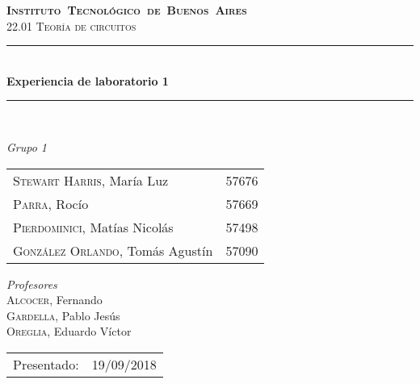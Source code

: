 \begin{titlepage}
\newcommand{\HRule}{\rule{\linewidth}{0.5mm}}
\center
\mbox{\textsc{\LARGE \bfseries {Instituto Tecnol\'ogico de Buenos Aires}}}\\[1.5cm]
\textsc{\Large 22.01 Teor\'ia de circuitos}\\[0.5cm]


\HRule \\[0.6cm]
{ \Huge \bfseries Experiencia de laboratorio 1}\\[0.4cm] %
\HRule \\[1.5cm]


{\large

\emph{Grupo 1}\\
\vspace{3px}

\begin{tabular}{lr} 	
\textsc{Stewart Harris}, Mar\'ia Luz  & 57676 \\ 	
\textsc{Parra}, Roc\'io  & 57669 \\ 	
\textsc{Pierdominici}, Mat\'ias Nicol\'as & 57498 \\     
\textsc{Gonz\'alez Orlando}, Tom\'as Agust\'in  & 57090 
\end{tabular}

\vspace{20px}

\emph{Profesores}\\
\vspace{3px}
\textsc{Alcocer,} Fernando\\ 	
\textsc{Gardella,} Pablo Jes\'us\\
\textsc{Oreglia,} Eduardo V\'ictor \\

\vspace{100px}

\begin{tabular}{ll}

Presentado: & 19/09/2018\\

\end{tabular}

}

\vfill

\end{titlepage}